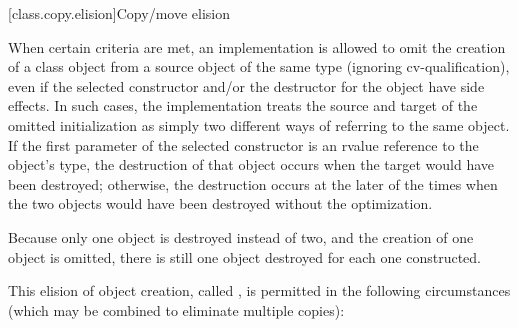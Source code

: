 [class.copy.elision]{Copy/move elision}%

\pnum
{}%
%
%
%
%
When certain criteria are met, an implementation is
allowed to omit the creation of a class object from
a source object of the same type (ignoring cv-qualification),
even if the selected constructor and/or the
destructor for the object have
%
side effects.  In such cases, the
implementation treats the source and target of the
omitted initialization as simply two different ways of
referring to the same object. If the first parameter of the
selected constructor is an rvalue reference to the object's type,
the destruction of that object occurs when the target would have been destroyed;
otherwise, the destruction occurs at the later of the times when the
two objects would have been destroyed without the
optimization.
\begin{note}
Because only one object is destroyed instead of two,
and the creation of one object is omitted,
there is still one object destroyed for each one constructed.
\end{note}
This elision of object creation, called
%
%
,
is permitted in the
following circumstances (which may be combined to
eliminate multiple copies):
